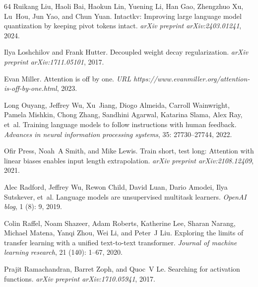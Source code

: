 \documentclass{article} \usepackage{iclr2025_conference,times}
\begin{document}
\begin{thebibliography}{64}
Ruikang Liu, Haoli Bai, Haokun Lin, Yuening Li, Han Gao, Zhengzhuo Xu, Lu~Hou, Jun Yao, and Chun Yuan.
\newblock Intactkv: Improving large language model quantization by keeping pivot tokens intact.
\newblock \emph{arXiv preprint arXiv:2403.01241}, 2024{}.

Ilya Loshchilov and Frank Hutter.
\newblock Decoupled weight decay regularization.
\newblock \emph{arXiv preprint arXiv:1711.05101}, 2017.

Evan Miller.
\newblock Attention is off by one.
\newblock \emph{URL https://www.evanmiller.org/attention-is-off-by-one.html}, 2023.

Long Ouyang, Jeffrey Wu, Xu~Jiang, Diogo Almeida, Carroll Wainwright, Pamela Mishkin, Chong Zhang, Sandhini Agarwal, Katarina Slama, Alex Ray, et~al.
\newblock Training language models to follow instructions with human feedback.
\newblock \emph{Advances in neural information processing systems}, 35: 27730--27744, 2022.

Ofir Press, Noah~A Smith, and Mike Lewis.
\newblock Train short, test long: Attention with linear biases enables input length extrapolation.
\newblock \emph{arXiv preprint arXiv:2108.12409}, 2021.

Alec Radford, Jeffrey Wu, Rewon Child, David Luan, Dario Amodei, Ilya Sutskever, et~al.
\newblock Language models are unsupervised multitask learners.
\newblock \emph{OpenAI blog}, 1 (8): 9, 2019.

Colin Raffel, Noam Shazeer, Adam Roberts, Katherine Lee, Sharan Narang, Michael Matena, Yanqi Zhou, Wei Li, and Peter~J Liu.
\newblock Exploring the limits of transfer learning with a unified text-to-text transformer.
\newblock \emph{Journal of machine learning research}, 21 (140): 1--67, 2020.

Prajit Ramachandran, Barret Zoph, and Quoc~V Le.
\newblock Searching for activation functions.
\newblock \emph{arXiv preprint arXiv:1710.05941}, 2017.


\end{thebibliography}
\end{document}
